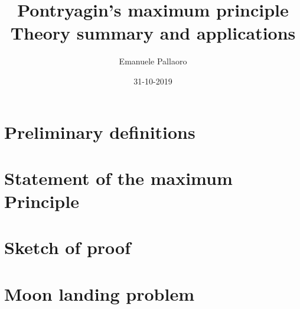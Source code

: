 \documentclass[14pt, margin=2pt]{article}
\title{%
	Pontryagin's maximum principle\\
	\large Theory summary and applications
}
\author{Emanuele Pallaoro}
\date{31-10-2019}
\numberwithin{equation}{section}
\begin{document}
\maketitle
\pagestyle{plain}

\section{Preliminary definitions}

\section{Statement of the maximum Principle}

\section{Sketch of proof}


\clearpage
\section{Moon landing problem}
\end{document}
